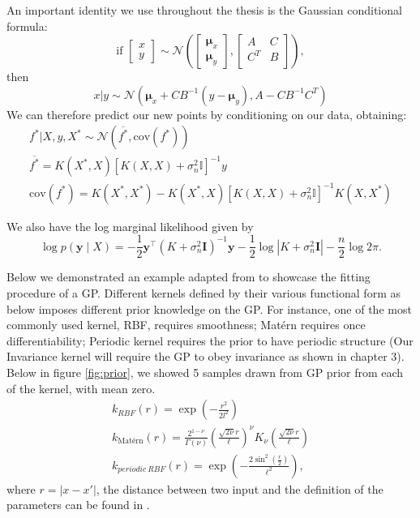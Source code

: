 \documentclass{statsmsc}
\begin{document}
An important identity we use throughout the thesis is the Gaussian conditional formula: 
$$
  \text{if }
  \begin{bmatrix}
    x\\y
  \end{bmatrix} 
  \sim \mathcal{N}
  \left(
    \begin{bmatrix}
      \mathbf{\mu}_x\\
      \mathbf{\mu}_y
    \end{bmatrix},
    \begin{bmatrix}
      A & C \\
      C^T & B\\
    \end{bmatrix}
  \right), 
$$ 
then 
\begin{equation}
  x|y\sim \mathcal{N}\left(\mathbf{\mu}_x+CB^{-1}(y-\mathbf{\mu}_y),A-CB^{-1}C^T\right)
  \label{equ:normal_condtion}
\end{equation}
We can therefore predict our new points by conditioning on our data, obtaining: 
\begin{equation*}
\begin{gathered}
f^*|X, y, X^* \sim \mathcal{N} \left(\overline{f^*}, \mathrm{cov}(f^*)\right)\\ 
\overline{f^*} = K(X^*, X)[K(X,X)+\sigma^2_n\mathbb{I}]^{-1}y\\
\mathrm{cov}(f^*) = K(X^*, X^*) - K(X^*, X)[K(X, X)+\sigma^2_n\mathbb{I}]^{-1}K(X, X^*)
\end{gathered}
\end{equation*}

We also have the log marginal likelihood given by 
$$
\log p(\mathbf{y} \mid X)=-\frac{1}{2} \mathbf{y}^{\top}\left(K+\sigma_{n}^{2} \mathbf{I}\right)^{-1} \mathbf{y}-\frac{1}{2} \log \left|K+\sigma_{n}^{2} \mathbf{I}\right|-\frac{n}{2} \log 2 \pi.
$$

Below we demonstrated an example adapted from \cite{GPflow2017} to showcase the fitting procedure of a GP.
Different kernels defined by their various functional form as below imposes different prior knowledge on the GP.
For instance, one of the most commonly used kernel, RBF, requires smoothness; Matérn requires once differentiability; Periodic kernel requires the prior to have periodic structure (Our Invariance kernel will require the GP to obey invariance as shown in chapter 3).
Below in figure \ref{fig:prior}, we showed 5 samples drawn from GP prior from each of the kernel, with mean zero.
\begin{equation*}
  \begin{gathered}
    k_{RBF}(r) = \exp(-\frac{r^2}{2l^2}) \\
    k_{\text {Matérn}}(r)=\frac{2^{1-\nu}}{\Gamma(\nu)}\left(\frac{\sqrt{2 \nu} r}{\ell}\right)^{\nu} K_{\nu}\left(\frac{\sqrt{2 \nu} r}{\ell}\right) \\
    k_{periodic\ RBF}(r)=\exp \left(-\frac{2 \sin ^{2}\left(\frac{r}{2}\right)}{\ell^{2}}\right),
  \end{gathered}
\end{equation*}
where $r=|x-x'|$, the distance between two input and the definition of the parameters can be found in \cite{rasmussen_williams_2006}.
\end{document}
